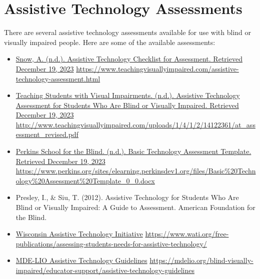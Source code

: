 \documentclass[12pt,letterpaper,twoside]{extreport}
\begin{document}
\begin{appendices}
\hypertarget{trouble4}{}\section[Assistive Technology Assessments]{Assistive Technology Assessments}\label{trouble4}
There are several assistive technology assessments available for use with blind or visually impaired people. Here are some of the available assessments:
\begin{itemize}[leftmargin=*]
\item \href{https://www.teachingvisuallyimpaired.com/assistive-technology-assessment.html}{Snow, A. (n.d.). Assistive Technology Checklist for Assessment. Retrieved December 19, 2023} \break\url{https://www.teachingvisuallyimpaired.com/assistive-technology-assessment.html}
\item \href{http://www.teachingvisuallyimpaired.com/uploads/1/4/1/2/14122361/at_assessment_revised.pdf}{Teaching Students with Visual Impairments. (n.d.). Assistive Technology Assessment for Students Who Are Blind or Visually Impaired. Retrieved December 19, 2023} \break\url{http://www.teachingvisuallyimpaired.com/uploads/1/4/1/2/14122361/at_assessment_revised.pdf}
\item \href{https://www.perkins.org/sites/elearning.perkinsdev1.org/files/Basic\%20Technology\%20Assessment\%20Template_0_0.docx}{Perkins School for the Blind. (n.d.). Basic Technology Assessment Template. Retrieved December 19, 2023} \break\url{https://www.perkins.org/sites/elearning.perkinsdev1.org/files/Basic\%20Technology\%20Assessment\%20Template_0_0.docx}
\item Presley, I., \& Siu, T. (2012). Assistive Technology for Students Who Are Blind or Visually Impaired: A Guide to Assessment. American Foundation for the Blind.
\item \href{https://www.wati.org/free-publications/assessing-students-needs-for-assistive-technology/}{Wisconsin Assistive Technology Initiative} \break\url{https://www.wati.org/free-publications/assessing-students-needs-for-assistive-technology/}
\item \href{https://mdelio.org/blind-visually-impaired/educator-support/assistive-technology-guidelines}{MDE-LIO Assistive Technology Guidelines} \break\url{https://mdelio.org/blind-visually-impaired/educator-support/assistive-technology-guidelines}


\end{itemize}
\end{appendices}
\pagebreak
\end{document}

